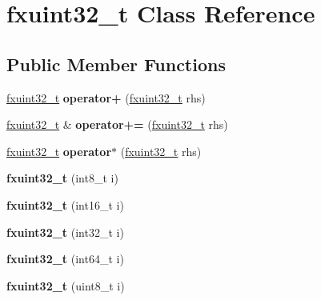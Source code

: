 \hypertarget{classfxuint32__t}{}\section{fxuint32\+\_\+t Class Reference}
\label{classfxuint32__t}
\subsection*{Public Member Functions}
\begin{DoxyCompactItemize}
\item 
\hyperlink{classfxuint32__t}{fxuint32\+\_\+t} {\bfseries operator+} (\hyperlink{classfxuint32__t}{fxuint32\+\_\+t} rhs)\hypertarget{classfxuint32__t_a436d7c38d819b6bd2eae58f8fec4517a}{}\label{classfxuint32__t_a436d7c38d819b6bd2eae58f8fec4517a}

\item 
\hyperlink{classfxuint32__t}{fxuint32\+\_\+t} \& {\bfseries operator+=} (\hyperlink{classfxuint32__t}{fxuint32\+\_\+t} rhs)\hypertarget{classfxuint32__t_a451b45d727bca1f16bd18c95b1dd56a2}{}\label{classfxuint32__t_a451b45d727bca1f16bd18c95b1dd56a2}

\item 
\hyperlink{classfxuint32__t}{fxuint32\+\_\+t} {\bfseries operator$\ast$} (\hyperlink{classfxuint32__t}{fxuint32\+\_\+t} rhs)\hypertarget{classfxuint32__t_a18af2dc2df20a29b77d82881653d3e94}{}\label{classfxuint32__t_a18af2dc2df20a29b77d82881653d3e94}

\item 
{\bfseries fxuint32\+\_\+t} (int8\+\_\+t i)\hypertarget{classfxuint32__t_ab2e1993ddb1e94393854f999d7e16fd5}{}\label{classfxuint32__t_ab2e1993ddb1e94393854f999d7e16fd5}

\item 
{\bfseries fxuint32\+\_\+t} (int16\+\_\+t i)\hypertarget{classfxuint32__t_ab9570d48f5a86683d8d6d153a54a0bcf}{}\label{classfxuint32__t_ab9570d48f5a86683d8d6d153a54a0bcf}

\item 
{\bfseries fxuint32\+\_\+t} (int32\+\_\+t i)\hypertarget{classfxuint32__t_adf9756ded03391cdb1943ab2a41e4345}{}\label{classfxuint32__t_adf9756ded03391cdb1943ab2a41e4345}

\item 
{\bfseries fxuint32\+\_\+t} (int64\+\_\+t i)\hypertarget{classfxuint32__t_aaa38cb16d0935a085bab32f189a6b79c}{}\label{classfxuint32__t_aaa38cb16d0935a085bab32f189a6b79c}

\item 
{\bfseries fxuint32\+\_\+t} (uint8\+\_\+t i)\hypertarget{classfxuint32__t_a2b74df6524a93e1b32d20773ff9833c2}{}\label{classfxuint32__t_a2b74df6524a93e1b32d20773ff9833c2}


\end{DoxyCompactItemize}
